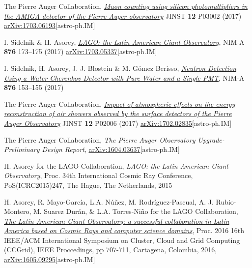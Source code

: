 \begin{etaremune}
\item {}The Pierre Auger Collaboration, \href{https://doi.org/10.1088/1748-0221/12/03/P03002}{\emph{Muon counting using silicon photomultipliers in the AMIGA detector of the Pierre Auger observatory}} JINST {\bf 12} P03002 (2017) \href{http://arxiv.org/abs/1703.06193}{arXiv:1703.06193}[astro-ph.IM]

\item {}I. Sidelnik \& H. Asorey, \href{https://doi.org/10.1016/j.nima.2017.02.069}{\emph{LAGO: the Latin American Giant Observatory}}, NIM-A {\bf{876}} 173--175 (2017) \href{http://arxiv.org/abs/1703.05337}{arXiv:1703.05337}[astro-ph.IM]

\item {} I. Sidelnik, H. Asorey, J. J. Blostein \& M. Gómez Berisso, \href{https://doi.org/10.1016/j.nima.2017.02.048}{\emph{Neutron Detection Using a Water Cherenkov Detector with Pure Water and a Single PMT}}, NIM-A {\bf{876}} 153--155 (2017)

\item {}The Pierre Auger Collaboration, \href{https://doi.org/10.1088/1748-0221/12/02/P02006}{\emph{Impact of atmospheric effects on the energy reconstruction of air showers observed by the surface detectors of the Pierre Auger Observatory}} JINST {\bf 12} P02006 (2017) \href{http://arxiv.org/abs/1702.02835}{arXiv:1702.02835}[astro-ph.IM]

\item {} The Pierre Auger Collaboration, {\emph{The Pierre Auger Observatory Upgrade-Preliminary Design Report}}, \href{http://arxiv.org/abs/1604.03637}{arXiv:1604.03637}[astro-ph.IM]
	
\item {}H. Asorey for the LAGO Collaboration, {\emph{LAGO: the Latin American Giant Observatory}}, \en Proc. 34th International Cosmic Ray Conference, PoS(ICRC2015)247, The Hague, The Netherlands, 2015

\item {} H. Asorey, R. Mayo-García, L.A. Núñez, M. Rodríguez-Pascual, A. J. Rubio-Montero, M. Suarez Durán, \& L.A. Torres-Niño for the LAGO Collaboration, {\emph{\href{http://dx.doi.org/10.1109/CCGrid.2016.110}{The Latin American Giant Observatory: a successful collaboration in Latin America based on Cosmic Rays and computer science domains}}}, \en Proc. 2016 16th IEEE/ACM International Symposium on Cluster, Cloud and Grid Computing (CCGrid), IEEE Proccedings, pp 707-711, Cartagena, Colombia, 2016, \href{http://arxiv.org/abs/1605.09295}{arXiv:1605.09295}[astro-ph.IM]


\end{etaremune}
